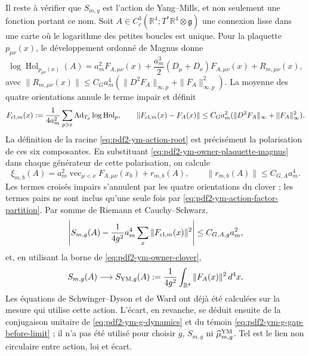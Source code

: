 Il reste à vérifier que $S_{m,g}$ est l’action de Yang--Mills, et non seulement une
fonction portant ce nom. Soit
$A\in C_c^3(\mathbb R^4;T^*\mathbb R^4\otimes\mathfrak g)$ une connexion lisse dans
une carte où le logarithme des petites boucles est unique. Pour la plaquette
$p_{\mu\nu}(x)$, le développement ordonné de Magnus donne
\begin{equation}\label{eq:pdf2-ym-owner-plaquette-magnus}
 \log\operatorname{Hol}_{p_{\mu\nu}(x)}(A)
 =a_m^2F_{A,\mu\nu}(x)
  +\frac{a_m^3}{2}(D_\mu+D_\nu)F_{A,\mu\nu}(x)
  +R_{m,\mu\nu}(x),
\end{equation}
avec $\|R_{m,\mu\nu}(x)\|\le C_G a_m^4
(\|D^2F_A\|_{\infty,p}+\|F_A\|_{\infty,p}^2)$. La moyenne des quatre orientations annule le terme impair et définit
\begin{equation}\label{eq:pdf2-ym-owner-clover}
 F_{{\rm cl},m}(x)
 :=\frac1{4a_m^2}\sum_{p\ni x}
  \operatorname{Ad}_{T_p}\log\operatorname{Hol}_p,
 \qquad
 \|F_{{\rm cl},m}(x)-F_A(x)\|
 \le C_G a_m^2(\|D^2F_A\|_\infty+\|F_A\|_\infty^2).
\end{equation}
La définition de la racine \eqref{eq:pdf2-ym-action-root} est précisément la polarisation de ces six composantes. En substituant \eqref{eq:pdf2-ym-owner-plaquette-magnus} dans chaque générateur de cette polarisation, on calcule
\begin{equation}\label{eq:pdf2-ym-owner-action-root-smooth-chart}
 \xi_{m,b}(A)
 =a_m^2\operatorname{vec}_{\mu<\nu}F_{A,\mu\nu}(x_b)
  +r_{m,b}(A),
 \qquad
 \|r_{m,b}(A)\|\le C_{G,A}a_m^4.
\end{equation}
Les termes croisés impairs s’annulent par les quatre orientations du clover ;
les termes pairs ne sont inclus qu’une seule fois par
\eqref{eq:pdf2-ym-action-factor-partition}. Par somme de Riemann et
Cauchy--Schwarz,
\begin{equation}\label{eq:pdf2-ym-owner-action-error}
 \left|S_{m,g}(A)-\frac1{4g^2}
  a_m^4\sum_x\|F_{{\rm cl},m}(x)\|^2\right|
 \le C_{G,A,g}a_m^2,
\end{equation}
et, en utilisant la borne de \eqref{eq:pdf2-ym-owner-clover},
\begin{equation}\label{eq:pdf2-ym-owner-f2}
 S_{m,g}(A)\longrightarrow
 S_{{\rm YM},g}(A):=\frac1{4g^2}
 \int_{\mathbb R^4}\|F_A(x)\|^2\,d^4x.
\end{equation}
Les équations de Schwinger--Dyson et de Ward ont déjà été calculées sur la mesure qui utilise
cette action. L’écart, en revanche, se déduit ensuite de la conjugaison unitaire de
\eqref{eq:pdf2-ym-g-dynamics} et du témoin
\eqref{eq:pdf2-ym-g-gap-before-limit} ; il n’a pas été utilisé pour choisir $g$, $S_{m,g}$ ni
$\widehat\mu_{m,g}^{\rm YM}$. Tel est le lien non circulaire entre action, loi et écart.


